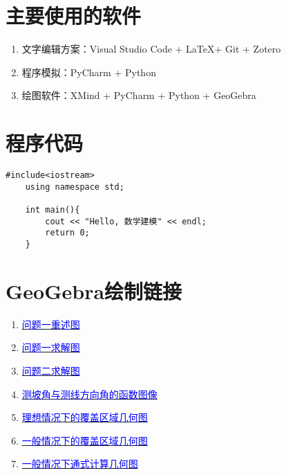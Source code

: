 


\nocite{*}


\appendix
\section{主要使用的软件}

\begin{enumerate}
    \item 文字编辑方案：Visual Studio Code + \LaTeX + Git + Zotero
    \item 程序模拟：PyCharm + Python
    \item 绘图软件：XMind + PyCharm + Python + GeoGebra
\end{enumerate}

\section{程序代码}

\begin{lstlisting}[caption={类的定义语句}]
    #include<iostream>
    using namespace std;

    int main(){
        cout << "Hello, 数学建模" << endl;
        return 0;
    }
\end{lstlisting}

\section{GeoGebra绘制链接}

\begin{enumerate}
    \item \href{https://www.geogebra.org/m/fza22fcy}{\textcolor{blue}{问题一重述图}}
    \item \href{https://www.geogebra.org/m/hpkkarys}{\textcolor{blue}{问题一求解图}}
    \item \href{https://www.geogebra.org/m/f6kfjvru}{\textcolor{blue}{问题二求解图}}
    \item \href{https://www.geogebra.org/m/n8saurfn}{\textcolor{blue}{测坡角与测线方向角的函数图像}}
    \item \href{https://www.geogebra.org/m/xcvstdzg}{\textcolor{blue}{理想情况下的覆盖区域几何图}}
    \item \href{https://www.geogebra.org/m/absuxwpk}{\textcolor{blue}{一般情况下的覆盖区域几何图}}
    \item \href{https://www.geogebra.org/m/jzwhwcqr}{\textcolor{blue}{一般情况下通式计算几何图}}
\end{enumerate}
